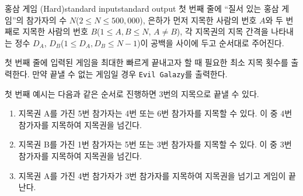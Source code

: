 \begin{problem}{홍삼 게임 (Hard)}{standard input}{standard output}
\InputFile
첫 번째 줄에 ``질서 있는 홍삼 게임''의 참가자의 수 $N$($2 \le N \le 500,000$), 은하가 먼저 지목한 사람의 번호 $A$와 두 번째로 지목한 사람의 번호 $B$($1 \le A, B \le N$, $A \neq B$), 각 지목권의 지목 간격을 나타내는 정수 $D_{A}$, $D_{B}$($1 \le D_{A}, D_{B} \le N-1$)이 공백을 사이에 두고 순서대로 주어진다.

\OutputFile
첫 번째 줄에 입력된 게임을 최대한 빠르게 끝내고자 할 때 필요한 최소 지목 횟수를 출력한다. 만약 끝낼 수 없는 게임일 경우 \texttt{Evil Galazy}를 출력한다.

\Example

\begin{example}
%
%
\end{example}

\Notes

첫 번째 예시는 다음과 같은 순서로 진행하면 3번의 지목으로 끝낼 수 있다.

\begin{enumerate}
\item{지목권 A를 가진 5번 참가자는 4번 또는 6번 참가자를 지목할 수 있다. 이 중 4번 참가자를 지목하여 지목권을 넘긴다.}
\item{지목권 B를 가진 1번 참가자는 5번 또는 3번 참가자를 지목할 수 있다. 이 중 3번 참가자를 지목하여 지목권을 넘긴다.}
\item{지목권 A를 가진 4번 참가자가 3번 참가자를 지목하여 지목권을 넘기고 게임이 끝난다.}
\end{enumerate}

\end{problem}
